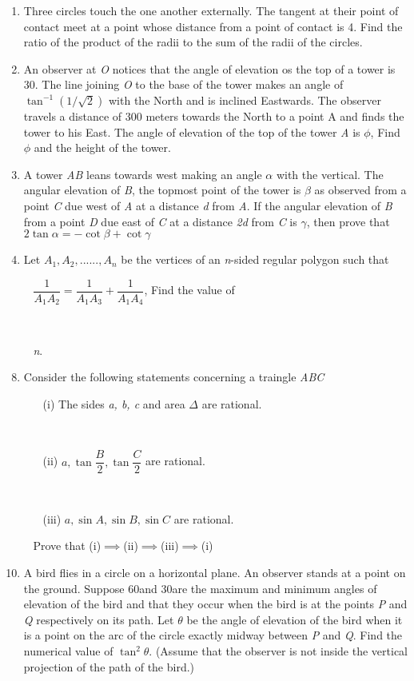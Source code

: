 \documentclass[journal,12pt,twocolumn]{IEEEtran}
\begin{document}
\begin{enumerate}
 \item Three circles touch the one another externally. The tangent at their point of contact meet at a point whose distance from a point of contact is 4. Find the ratio of the product of the radii to the sum of the radii of the circles.
 \item An observer at \textsl{O} notices that the angle of elevation os the top of a tower is 30\degree. The line joining \textsl{O} to the base of the tower makes an angle of $\tan^{-1}\left(1/\sqrt{2}\right)$ with the North and is inclined Eastwards. The observer travels a distance of 300 meters towards the North to a point A and finds the tower to his East. The angle of elevation of the top of the tower \textsl{A} is $\phi$, Find $\phi$ and the height of the tower.
 \item A tower \textsl{AB} leans towards west making an angle $\alpha$ with the vertical. The angular elevation of \textsl{B}, the topmost point of the tower is $\beta$ as observed from a point \textsl{C} due west of \textsl{A} at a distance \textsl{d} from \textsl{A}. If the angular elevation of \textsl{B} from a point \textsl{D} due east of \textsl{C} at a distance \textsl{2d} from \textsl{C} is $\gamma$, then prove that $2\tan\alpha=-\cot\beta+\cot\gamma$
 \item Let \textsl{$A_1, A_2,......, A_n$} be the vertices of an \textsl{n}-sided regular polygon such that \item[~]$\dfrac{1}{A_1A_2}=\dfrac{1}{A_1A_3}+\dfrac{1}{A_1A_4}$, Find the value of \item[~] \item[~] \textsl{n}.  
 \item Consider the following statements concerning a traingle \textsl{ABC}
 \begin{itemize}
 \item[(i)] The sides \textsl{a, b, c} and area $\Delta$ are rational. \item[~]
 \item[(ii)] $a, \tan\dfrac{B}{2}, \tan\dfrac{C}{2}$ are rational. \item[~]
 \item[(iii)] $a, \sin A, \sin B, \sin C$ are rational. 
 \end{itemize}\item[~]
 Prove that (i)$\implies$(ii)$\implies$(iii)$\implies$(i)
 \item A bird flies in a circle on a horizontal plane. An observer stands at a point on the ground. Suppose 60\degree and 30\degree are the maximum and minimum angles of elevation of the bird and that they occur when the bird is at the points \textsl{P} and \textsl{Q} respectively on its path. Let $\theta$ be the angle of elevation of the bird when it is a point on the arc of the circle exactly midway between \textsl{P} and \textsl{Q}. Find the numerical value of $\tan^2\theta$. (Assume that the observer is not inside the vertical projection of the path of the bird.)

\end{enumerate}
\end{document}
